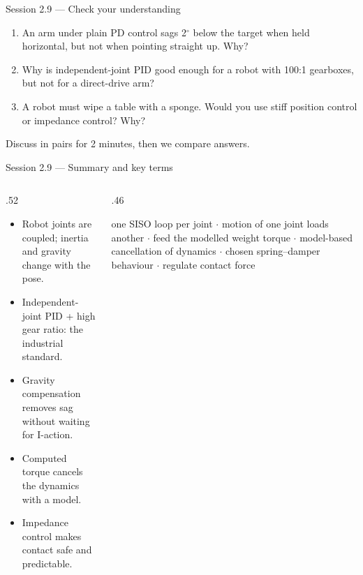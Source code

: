 \documentclass[aspectratio=169,10pt]{beamer}
\begin{document}
\begin{frame}{Session 2.9 --- Check your understanding}
\begin{keybox}
\begin{enumerate}\setlength\itemsep{2mm}
\item An arm under plain PD control sags 2$^\circ$ below the target when held horizontal, but not when pointing straight up. Why?
\item Why is independent-joint PID good enough for a robot with 100:1 gearboxes, but not for a direct-drive arm?
\item A robot must wipe a table with a sponge. Would you use stiff position control or impedance control? Why?
\end{enumerate}
\end{keybox}
\vspace{2mm}
{\small\color{mkGray}Discuss in pairs for 2 minutes, then we compare answers.}
\end{frame}

\begin{frame}{Session 2.9 --- Summary and key terms}
\begin{columns}[T]
\begin{column}{.52\textwidth}
\begin{keybox}
\begin{itemize}\setlength\itemsep{.4mm}
\item Robot joints are coupled; inertia and gravity change with the pose.
\item Independent-joint PID + high gear ratio: the industrial standard.
\item Gravity compensation removes sag without waiting for I-action.
\item Computed torque cancels the dynamics with a model.
\item Impedance control makes contact safe and predictable.
\end{itemize}
\end{keybox}
\end{column}
\begin{column}{.46\textwidth}
\begin{defbox}
\small
{} one SISO loop per joint $\cdot$  motion of one joint loads another $\cdot$  feed the modelled weight torque $\cdot$  model-based cancellation of dynamics $\cdot$  chosen spring--damper behaviour $\cdot$  regulate contact force
\end{defbox}
\end{column}
\end{columns}
\end{frame}
\end{document}
